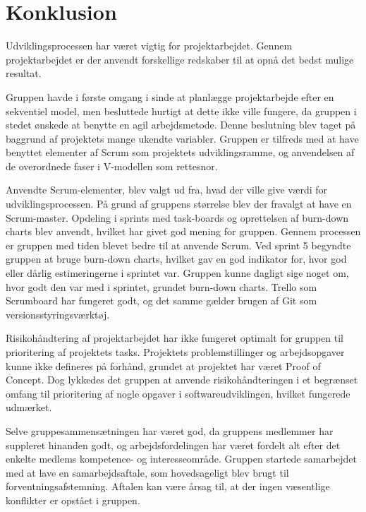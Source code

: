 \chapter{Konklusion}\label{Konklusion}
Udviklingsprocessen har været vigtig for projektarbejdet. Gennem projektarbejdet er der anvendt forskellige redskaber til at opnå det bedst mulige resultat. 

Gruppen havde i første omgang i sinde at planlægge projektarbejde efter en sekventiel model, men besluttede hurtigt at dette ikke ville fungere, da gruppen i stedet ønskede at benytte en agil arbejdsmetode. Denne beslutning blev taget på baggrund af projektets mange ukendte variabler. Gruppen er tilfreds med at have benyttet elementer af Scrum som projektets udviklingsramme, og anvendelsen af de overordnede faser i V-modellen som rettesnor.

Anvendte Scrum-elementer, blev valgt ud fra, hvad der ville give værdi for udviklingsprocessen. På grund af gruppens størrelse blev der fravalgt at have en Scrum-master. Opdeling i sprints med task-boards og oprettelsen af burn-down charts blev anvendt, hvilket har givet god mening for gruppen. Gennem processen er gruppen med tiden blevet bedre til at anvende Scrum. Ved sprint 5 begyndte gruppen at bruge burn-down charts, hvilket gav en god indikator for, hvor god eller dårlig estimeringerne i sprintet var. Gruppen kunne dagligt sige noget om, hvor godt den var med i sprintet, grundet burn-down charts. Trello som Scrumboard har fungeret godt, og det samme gælder brugen af Git som versionsstyringsværktøj.

Risikohåndtering af projektarbejdet har ikke fungeret optimalt for gruppen til prioritering af projektets tasks. Projektets problemstillinger og arbejdsopgaver kunne ikke defineres på forhånd, grundet at projektet har været Proof of Concept. Dog lykkedes det gruppen at anvende risikohåndteringen i et begrænset omfang til prioritering af nogle opgaver i softwareudviklingen, hvilket fungerede udmærket. 

Selve gruppesammensætningen har været god, da gruppens medlemmer har suppleret hinanden godt, og arbejdsfordelingen har været fordelt alt efter det enkelte medlems kompetence- og interesseområde. Gruppen startede samarbejdet med at lave en samarbejdsaftale, som hovedsageligt blev brugt til forventningsafstemning. Aftalen kan være årsag til, at der ingen væsentlige konflikter er opstået i gruppen. 